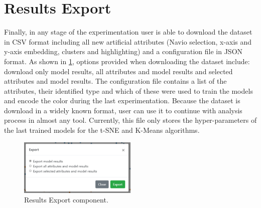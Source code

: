 \section{Results Export}
\label{section3.7}

Finally, in any stage of the experimentation user is able to download the dataset in CSV format including all new artificial attributes (Navio selection, x-axis and y-axis embedding, clusters and highlighting) and a configuration file in JSON format. As shown in \ref{fig:results-export-component}, options provided when downloading the dataset include: download only model results, all attributes and model results and selected attributes and model results. The configuration file contains a list of the attributes, their identified type and which of these were used to train the models and encode the color during the last experimentation. Because the dataset is download in a widely known format, user can use it to continue with analysis process in almost any tool. Currently, this file only stores the hyper-parameters of the last trained models for the t-SNE and K-Means algorithms.

\begin{figure}[ht]
 \centering
 \includegraphics[width=0.5\textwidth]{results-export.png}
 \caption{Results Export component.}
 \label{fig:results-export-component}
\end{figure}